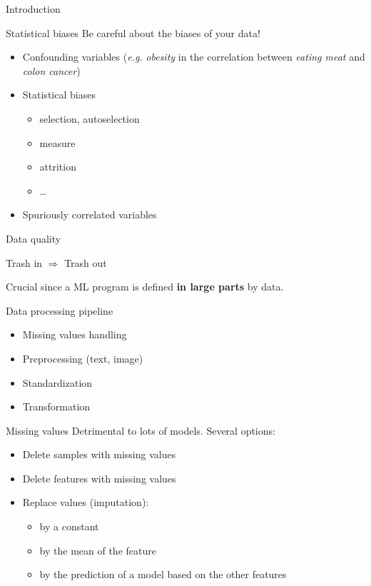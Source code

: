 \begin{frame}{Introduction}
\end{frame}


\begin{frame}{Statistical biases}
  Be careful about the biases of your data!
  \begin{itemize}[<+->]
  \item Confounding variables (\emph{e.g.} \emph{obesity} in the correlation between \emph{eating meat} and \emph{colon cancer})
  \item Statistical biases
    \begin{itemize}
    \item selection, autoselection
    \item measure
    \item attrition
    \item …
    \end{itemize}
  \item Spuriously correlated variables 
  \end{itemize}
\end{frame}

\begin{frame}{Data quality}
  \begin{center}
    Trash in $\Rightarrow$ Trash out
  \end{center}

  Crucial since a ML program is defined \textbf{in large parts} by data.
\end{frame}

\begin{frame}{Data processing pipeline}
  \begin{itemize}
  \item Missing values handling
  \item Preprocessing (text, image)
  \item Standardization
  \item Transformation
  \end{itemize}
\end{frame}

\begin{frame}{Missing values}
  Detrimental to lots of models. Several options:
  \begin{itemize}[<+(1)->]
  \item Delete samples with missing values
  \item Delete features with missing values
  \item Replace values (imputation):
    \begin{itemize}
    \item by a constant
    \item by the mean of the feature
    \item by the prediction of a model based on the other features
    \end{itemize}
  \end{itemize}
\end{frame}

